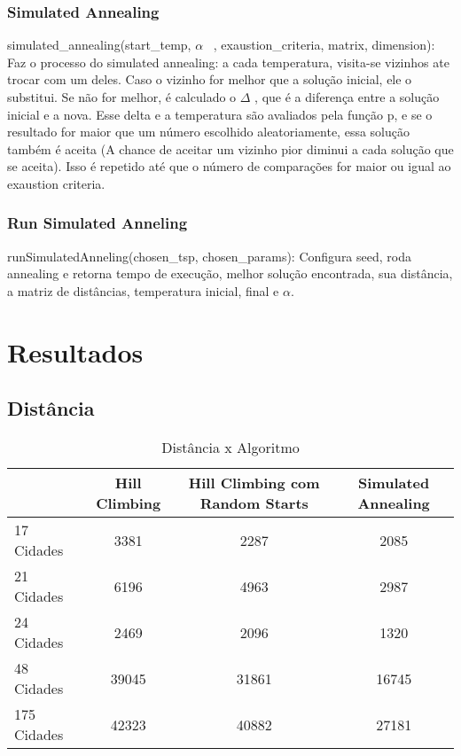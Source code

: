 \documentclass[a4paper,12 pts]{article}
\begin{document}
		\subsubsection{Simulated Annealing}
			simulated\_annealing(start\_temp, $\alpha$ \ , exaustion\_criteria, matrix, dimension): Faz o processo do simulated annealing: a cada temperatura, visita-se vizinhos ate trocar com um deles. Caso o vizinho for melhor que a solução inicial, ele o substitui. Se não for melhor, é calculado o $\Delta$ , que é a diferença entre a solução inicial e a nova. Esse delta e a temperatura são avaliados pela função p, e se o resultado for maior que um número escolhido aleatoriamente, essa solução também é aceita (A chance de aceitar um vizinho pior diminui a cada solução que se aceita). Isso é repetido até que o número de comparações for maior ou igual ao exaustion criteria.
		\subsubsection{Run Simulated Anneling}
			runSimulatedAnneling(chosen\_tsp, chosen\_params): Configura seed, roda annealing e retorna tempo de execução, melhor solução encontrada, sua distância, a matriz de distâncias, temperatura inicial, final e $\alpha$.

\newpage
\section{Resultados}
	\subsection{Distância}
		\begin{table}[ht]
			\centering
			\begin{tabular}{|l|c|c|c|}
				\hline
				\multicolumn{1}{|c|}{} & Hill Climbing & Hill Climbing com Random Starts & Simulated Annealing \\ \hline
				17 Cidades & 3381 & 2287 & 2085 \\ \hline
				21 Cidades & 6196 & 4963 & 2987 \\ \hline
				24 Cidades & 2469 & 2096 & 1320 \\ \hline
				48 Cidades & 39045 & 31861 & 16745 \\ \hline
				175 Cidades & 42323 & 40882 & 27181 \\ \hline
			\end{tabular}
			\caption{Distância x Algoritmo}
			\label{my-distance}
		\end{table}
\end{document}
